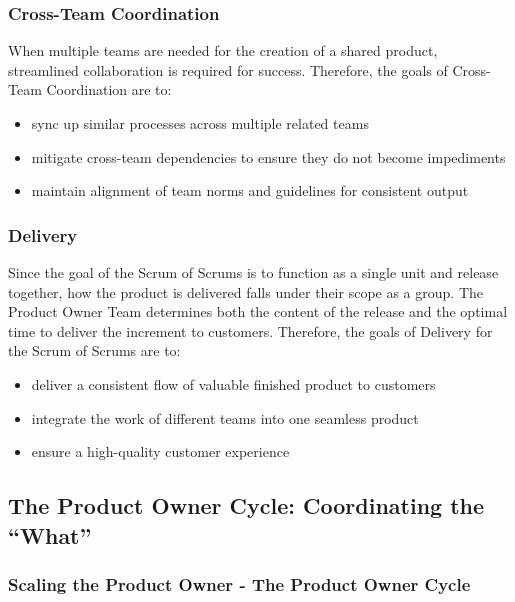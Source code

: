 \documentclass[12pt,a4paper,parskip=full]{scrartcl}
\begin{document}
\subsubsection{Cross-Team Coordination}\label{cross-team-coordination}

When multiple teams are needed for the creation of a shared product,
streamlined collaboration is required for success. Therefore, the goals
of Cross-Team Coordination are to:

\begin{itemize}
\itemsep1pt\parskip0pt
\item
  sync up similar processes across multiple related teams
\item
  mitigate cross-team dependencies to ensure they do not become
  impediments
\item
  maintain alignment of team norms and guidelines for consistent output
\end{itemize}

\subsubsection{Delivery}\label{Delivery}

Since the goal of the Scrum of Scrums is to function as a single unit and release together, how the product is delivered falls under their scope as a group. The Product Owner Team determines both the content of the release and the optimal time to deliver the increment to customers.  Therefore, the goals of Delivery for the Scrum of Scrums are to:

\begin{itemize}
\itemsep1pt\parskip0pt
\item
  deliver a consistent flow of valuable finished product to customers
\item
  integrate the work of different teams into one seamless product
\item
  ensure a high-quality customer experience
\end{itemize}

\subsection{The Product Owner Cycle: Coordinating the
``What''}\label{The-product-owner-cycle}

\subsubsection{Scaling the Product Owner - The Product Owner
Cycle}\label{Scaling-the-product-owner}
\end{document}
